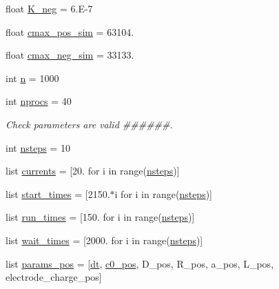 \begin{DoxyCompactItemize}
float \hyperlink{namespaceuser__input__full__battery___g_i_t_t_a64d0c5854299798787675bc91586023c}{K\-\_\-neg} = 6.\-E-\/7
\item 
float \hyperlink{namespaceuser__input__full__battery___g_i_t_t_aa5b015cc7d0bda453c6163023448db72}{cmax\-\_\-pos\-\_\-sim} = 63104.
\item 
float \hyperlink{namespaceuser__input__full__battery___g_i_t_t_ab7633a5e9c70aabfe6992e4fe521a1f9}{cmax\-\_\-neg\-\_\-sim} = 33133.
\item 
int \hyperlink{namespaceuser__input__full__battery___g_i_t_t_a76f11d9a0a47b94f72c2d0e77fb32240}{n} = 1000
\item 
int \hyperlink{namespaceuser__input__full__battery___g_i_t_t_ad7c4c17cf720ee538e27c02ab356ed6b}{nprocs} = 40
\begin{DoxyCompactList}\small\item\em Check parameters are valid \#\#\#\#\#\#. \end{DoxyCompactList}\item 
int \hyperlink{namespaceuser__input__full__battery___g_i_t_t_aa2414080b021dbb9b56eeaeedec0ffa2}{nsteps} = 10
\item 
list \hyperlink{namespaceuser__input__full__battery___g_i_t_t_a216022bdba987f127b6cc081ee78e2bd}{currents} = \mbox{[}20. for i in range(\hyperlink{namespaceuser__input__full__battery___g_i_t_t_aa2414080b021dbb9b56eeaeedec0ffa2}{nsteps})\mbox{]}
\item 
list \hyperlink{namespaceuser__input__full__battery___g_i_t_t_a377a515511d37e8c7ac5501847d6485d}{start\-\_\-times} = \mbox{[}2150.$\ast$i for i in range(\hyperlink{namespaceuser__input__full__battery___g_i_t_t_aa2414080b021dbb9b56eeaeedec0ffa2}{nsteps})\mbox{]}
\item 
list \hyperlink{namespaceuser__input__full__battery___g_i_t_t_a5a6deb885420d2b81e210e580767b1c1}{run\-\_\-times} = \mbox{[}150. for i in range(\hyperlink{namespaceuser__input__full__battery___g_i_t_t_aa2414080b021dbb9b56eeaeedec0ffa2}{nsteps})\mbox{]}
\item 
list \hyperlink{namespaceuser__input__full__battery___g_i_t_t_ae584b229c7b1ea3d8330e6038884ffd3}{wait\-\_\-times} = \mbox{[}2000. for i in range(\hyperlink{namespaceuser__input__full__battery___g_i_t_t_aa2414080b021dbb9b56eeaeedec0ffa2}{nsteps})\mbox{]}
\item 
list \hyperlink{namespaceuser__input__full__battery___g_i_t_t_a51c49f845d3932a6a084187c90aab1ab}{params\-\_\-pos} = \mbox{[}\hyperlink{namespaceuser__input__full__battery___g_i_t_t_a778e38aa889751afffa2dea6b803e67a}{dt}, \hyperlink{namespaceuser__input__full__battery___g_i_t_t_a5abfcbf596ddd1acc1de08c37cfde9c3}{c0\-\_\-pos}, D\-\_\-pos, R\-\_\-pos, a\-\_\-pos, L\-\_\-pos, electrode\-\_\-charge\-\_\-pos\mbox{]}

\end{DoxyCompactItemize}
